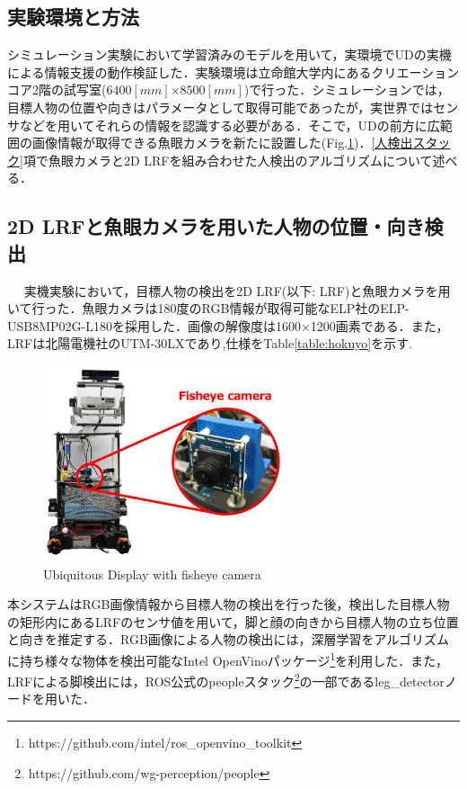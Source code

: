 \documentclass[12pt]{sonota/aislab}
\begin{document}
\subsection{実験環境と方法}
シミュレーション実験において学習済みのモデルを用いて，実環境でUDの実機による情報支援の動作検証した．実験環境は立命館大学内にあるクリエーションコア2階の試写室($6400[mm]$×$8500[mm]$)で行った．シミュレーションでは，目標人物の位置や向きはパラメータとして取得可能であったが，実世界ではセンサなどを用いてそれらの情報を認識する必要がある．そこで，UDの前方に広範囲の画像情報が取得できる魚眼カメラを新たに設置した(Fig.\ref{ud_with_fisheyecamera})．\ref{人検出スタック}項で魚眼カメラと2D LRFを組み合わせた人検出のアルゴリズムについて述べる．

\subsection{2D LRFと魚眼カメラを用いた人物の位置・向き検出}　\label{人検出スタック}
実機実験において，目標人物の検出を2D LRF(以下: LRF)と魚眼カメラを用いて行った．魚眼カメラは180度のRGB情報が取得可能なELP社のELP-USB8MP02G-L180を採用した．画像の解像度は1600×1200画素である．また，LRFは北陽電機社のUTM-30LXであり,仕様をTable\ref{table:hokuyo}を示す.

\begin{figure}[t]
\begin{center}
\includegraphics[clip, width=7cm]{figs/ud_with_fisheyecamera.eps}
\caption{Ubiquitous Display with fisheye camera}
\label{ud_with_fisheyecamera}
\end{center}
\end{figure}

本システムはRGB画像情報から目標人物の検出を行った後，検出した目標人物の矩形内にあるLRFのセンサ値を用いて，脚と顔の向きから目標人物の立ち位置と向きを推定する．RGB画像による人物の検出には，深層学習をアルゴリズムに持ち様々な物体を検出可能なIntel OpenVinoパッケージ\footnote{https://github.com/intel/ros\_openvino\_toolkit}を利用した．また，LRFによる脚検出には，ROS公式のpeopleスタック\footnote{https://github.com/wg-perception/people}の一部であるleg\_detectorノードを用いた．
\end{document}
